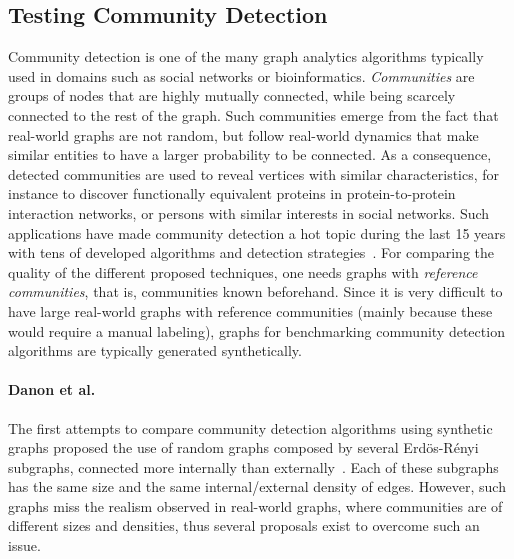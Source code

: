 \subsection{Testing Community Detection}
\label{sec:generators_community_detection}

Community detection is one of the many graph analytics algorithms typically used
in domains such as social networks or bioinformatics. \emph{Communities} are groups of nodes that are highly mutually connected, while being scarcely connected to
the rest of the graph. Such communities emerge from the fact that real-world graphs
are not random, but follow real-world dynamics that make similar entities to
have a larger probability to be connected. As a consequence, detected
communities are used to reveal vertices with similar characteristics, for
instance to discover functionally equivalent proteins in protein-to-protein
interaction networks, or persons with similar interests in social networks. Such
applications have made community detection a hot topic during the last 15
years with tens of developed algorithms and detection
strategies~\cite{doi:10.1002/wics.1403,Kim:2015:CDM:2854006.2854013}. For
comparing the quality of the different proposed techniques, one needs graphs
with \emph{reference communities}, that is, communities known beforehand. Since
it is very difficult to have large real-world graphs with reference communities
(mainly because these would require a manual labeling), graphs for benchmarking
community detection algorithms are typically generated synthetically.

\paragraph{Danon et al.} The first attempts to compare community detection algorithms using synthetic
graphs proposed the use of random graphs composed by several Erd\"{o}s-R\'{e}nyi
subgraphs, connected more internally than externally~\cite{danon2005comparing}.
Each of these subgraphs has the same size and the same internal/external density
of edges. However, such graphs miss the realism observed in real-world graphs, where
communities are of different sizes and densities, thus several proposals exist
to overcome such an issue.


